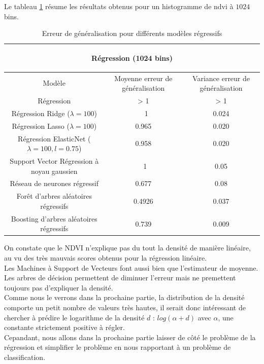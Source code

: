 \documentclass{book}
\begin{document}
Le tableau \ref{regression_resultats_1024} résume les résultats obtenus pour un histogramme de ndvi à $1024$ bins.
\begin{table}[H]
\begin{center}
\begin{adjustbox}{max width=\textwidth}
\begin{tabular}{|c|c|c|}
\hline
\multicolumn{3}{|c|}{\begin{bf}Régression (1024 bins)\end{bf}} \\
\hline 
Modèle & Moyenne erreur de généralisation & Variance erreur de généralisation\\
\hline 
Régression & > 1 & > 1\\
\hline 
Régression Ridge ($\lambda=100$) & ~ 1 & 0.024\\
\hline 
Régression Lasso ($\lambda=100$) & 0.965 & 0.020\\
\hline 
Régression ElasticNet ($\lambda=100,l=0.75$) & 0.958 & 0.020\\
\hline
Support Vector Régression à noyau gaussien & ~1 & 0.05\\
\hline
Réseau de neurones régressif & 0.677 & 0.08\\
\hline
For\^{e}t d'arbres aléatoires régressifs & 0.4926 & 0.037\\
\hline
Boosting d'arbres aléatoires régressifs & 0.739 & 0.009\\
\hline
\end{tabular}
\end{adjustbox}
\end{center}
\caption{Erreur de généralisation pour différents modèles régressifs}
\label{regression_resultats_1024}
\end{table}

On constate que le NDVI n'explique pas du tout la densité de manière linéaire, au vu des très mauvais scores obtenus pour la régression linéaire.\\
Les Machines à Support de Vecteurs font aussi bien que l'estimateur de moyenne.\\
Les arbres de décision permettent de diminuer l'erreur mais ne premettent toujours pas d'expliquer la densité.\\
Comme nous le verrons dans la prochaine partie, la distribution de la densité comporte un petit nombre de valeurs très hautes, il serait donc intéressant
de chercher à prédire le logarithme de la densité $d$ : $log(\alpha+d)$ avec $\alpha$, une constante strictement positive à régler.\\
Cepandant, nous allons dans la prochaine partie laisser de côté le problème de la régression et simplifier le problème en nous
rapportant à un problème de classification.\\
\end{document}
